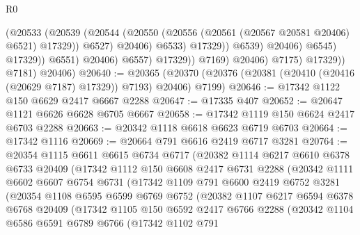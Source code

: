 \begin{lexlean}{R0}
\begin{coremodule}
                                          (@20533
                                            (@20539
                                              (@20544
                                                (@20550
                                                  (@20556
                                                    (@20561 (@20567 @20581 @20406) @6521)
                                                    @17329))
                                                @6527)
                                              @20406)
                                            @6533)
                                          @17329))
                                      @6539)
                                    @20406)
                                  @6545)
                                @17329))
                            @6551)
                          @20406)
                        @6557)
                      @17329))
                  @7169)
                @20406)
              @7175)
            @17329))
        @7181)
      @20406)
@20640 := @20365
    (@20370 (@20376 (@20381 (@20410 (@20416 (@20629 @7187) @17329)) @7193) @20406) @7199)
@20646 := @17342 @1122 @150 @6629 @2417 @6667 @2288
@20647 := @17335 @407
@20652 := @20647 @1121 @6626 @6628 @6705 @6667
@20658 := @17342 @1119 @150 @6624 @2417 @6703 @2288
@20663 := @20342 @1118 @6618 @6623 @6719 @6703
@20664 := @17342 @1116
@20669 := @20664 @791 @6616 @2419 @6717 @3281
@20764 := @20354
    @1115
    @6611
    @6615
    @6734
    @6717
    (@20382
      @1114
      @6217
      @6610
      @6378
      @6733
      @20409
      (@17342
        @1112
        @150
        @6608
        @2417
        @6731
        @2288
        (@20342
          @1111
          @6602
          @6607
          @6754
          @6731
          (@17342
            @1109
            @791
            @6600
            @2419
            @6752
            @3281
            (@20354
              @1108
              @6595
              @6599
              @6769
              @6752
              (@20382
                @1107
                @6217
                @6594
                @6378
                @6768
                @20409
                (@17342
                  @1105
                  @150
                  @6592
                  @2417
                  @6766
                  @2288
                  (@20342
                    @1104
                    @6586
                    @6591
                    @6789
                    @6766
                    (@17342
                      @1102
                      @791

\end{coremodule}
\end{lexlean}
